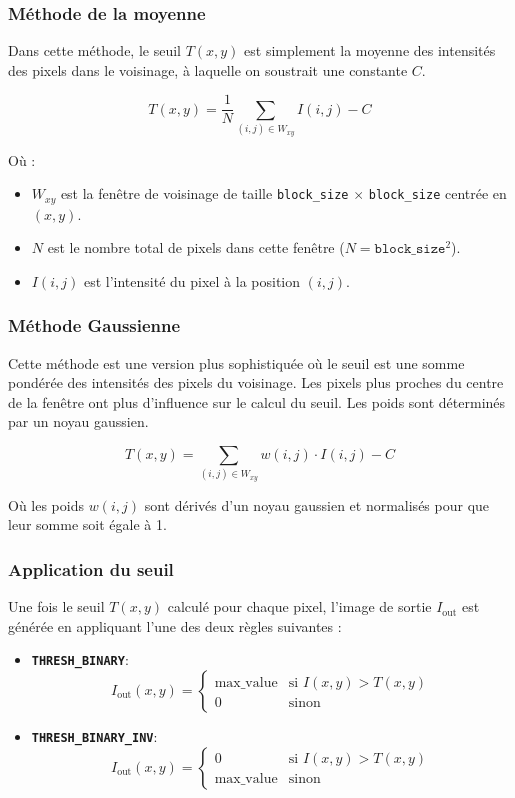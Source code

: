 \documentclass{article}
\begin{document}
\subsubsection{Méthode de la moyenne}
Dans cette méthode, le seuil \(T(x, y)\) est simplement la moyenne des intensités des pixels dans le voisinage, à laquelle on soustrait une constante \(C\).

\[
T(x, y) = \frac{1}{N} \sum_{(i, j) \in W_{xy}} I(i, j) - C
\]

Où :
\begin{itemize}
    \item \(W_{xy}\) est la fenêtre de voisinage de taille \texttt{block\_size} \(\times\) \texttt{block\_size} centrée en \((x, y)\).
    \item \(N\) est le nombre total de pixels dans cette fenêtre (\(N = \texttt{block\_size}^2\)).
    \item \(I(i, j)\) est l'intensité du pixel à la position \((i, j)\).
\end{itemize}

\subsubsection{Méthode Gaussienne}
Cette méthode est une version plus sophistiquée où le seuil est une somme pondérée des intensités des pixels du voisinage. Les pixels plus proches du centre de la fenêtre ont plus d'influence sur le calcul du seuil. Les poids sont déterminés par un noyau gaussien.

\[
T(x, y) = \sum_{(i, j) \in W_{xy}} w(i, j) \cdot I(i, j) - C
\]

Où les poids \(w(i, j)\) sont dérivés d'un noyau gaussien et normalisés pour que leur somme soit égale à 1.

\subsubsection{Application du seuil}
Une fois le seuil \(T(x, y)\) calculé pour chaque pixel, l'image de sortie \(I_{\text{out}}\) est générée en appliquant l'une des deux règles suivantes :
\begin{itemize}
    \item \textbf{\texttt{THRESH\_BINARY}}:
    \[
    I_{\text{out}}(x, y) =
    \begin{cases}
    \text{max\_value} & \text{si } I(x, y) > T(x, y) \\
    0 & \text{sinon}
    \end{cases}
    \]
    \item \textbf{\texttt{THRESH\_BINARY\_INV}}:
    \[
    I_{\text{out}}(x, y) =
    \begin{cases}
    0 & \text{si } I(x, y) > T(x, y) \\
    \text{max\_value} & \text{sinon}
    \end{cases}
    \]
\end{itemize}
\end{document}
